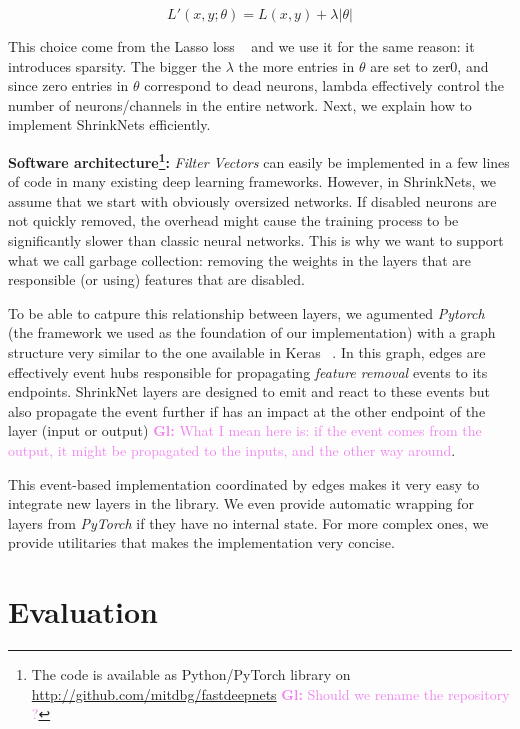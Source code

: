 \documentclass[sigconf]{acmart}
\newcommand{\gl}[1]{\textcolor{violet}{{\bf Gl:} #1}}
\begin{document}
\begin{equation}
  L'(x,y;\theta) = L(x, y) + \lambda|\theta|
\end{equation}

This choice come from the Lasso loss ~\cite{Tibshirani1996} and we use it for the same reason:
it introduces sparsity. The bigger the $\lambda$ the more entries in $\theta$
are set to zer0, and since zero entries in $\theta$ correspond to dead neurons,
lambda effectively control the number of neurons/channels in the entire
network.
Next, we explain how to implement ShrinkNets efficiently.

\textbf{Software architecture\footnote{The code is available as Python/PyTorch
    library on \url{http://github.com/mitdbg/fastdeepnets} \gl{Should we rename
      the repository ?}}: }\textit{Filter Vectors} can easily be implemented in
a few lines of code in many existing deep learning frameworks. However, in
ShrinkNets, we assume that we start with obviously oversized networks. If
disabled neurons are not quickly removed, the overhead might cause the training
process to be significantly slower than classic neural networks. This is why we
want to support what we call garbage collection: removing the weights in the
layers that are responsible (or using) features that are disabled.  \par To be
able to catpure this relationship between layers, we agumented \textit{Pytorch}
~\cite{paszke2017automatic} (the framework we used as the
foundation of our implementation) with a graph structure very similar to the
one available in Keras ~\cite{chollet2015keras}.  In this graph, edges are
effectively event hubs responsible for propagating \textit{feature removal}
events to its endpoints. ShrinkNet layers are designed to emit and react to
these events but also propagate the event further if has an impact at the other
endpoint of the layer (input or output) \gl{What I mean here is: if the event
  comes from the output, it might be propagated to the inputs, and the other
  way around}.  \par This event-based implementation coordinated by edges makes
it very easy to integrate new layers in the library.  We even provide automatic
wrapping for layers from \textit{PyTorch} if they have no internal state. For
more complex ones, we provide utilitaries that
makes the implementation very concise.

\section{Evaluation}
\end{document}
